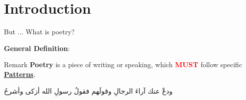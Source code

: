 \section{Introduction}



\begin{frame}[fragile]{But ... What is poetry?}

\textbf{\large General Definition}:
\begin{block}{Remark}
\textbf{Poetry} is a piece of writing or speaking, which
\textbf{\textcolor{red}{MUST}} follow specific
\alert{\underline{\textbf{Patterns}}}.
\end{block}


\begin{example}
	\begin{center}
		\begin{Arabic}
			ودعْ عنك آراءَ الرجالِ وقولَهم\hspace{3em}  فقولُ رسولِ الله أزكى وأشرحُ
		\end{Arabic}
	\end{center}
\end{example}

\end{frame}

